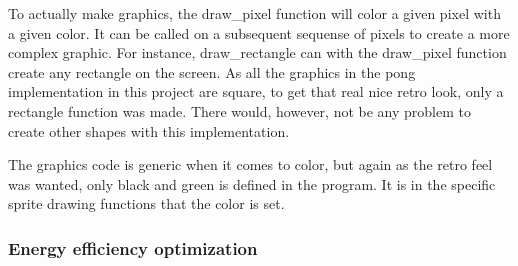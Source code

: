 To actually make graphics, the draw_pixel function will color a given pixel with a given color.
It can be called on a subsequent sequense of pixels to create a more complex graphic.
For instance, draw_rectangle can with the draw_pixel function create any rectangle on the screen.
As all the graphics in the pong implementation in this project are square, to get that real nice retro look, only a rectangle function was made.
There would, however, not be any problem to create other shapes with this implementation.

The graphics code is generic when it comes to color, but again as the retro feel was wanted, only black and green is defined in the program.
It is in the specific sprite drawing functions that the color is set.

\subsubsection{Energy efficiency optimization}
